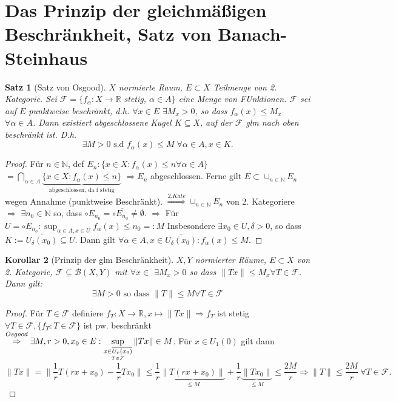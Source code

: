 \documentclass[ngerman]{report}
\theoremstyle{plain}%
\newtheorem{thm}{Satz}[chapter]
\newtheorem{cor}[thm]{Korollar}
\theoremstyle{definition}%
\theoremstyle{myStyle}
\newcommand{\R}{\mathbb{R}}
\newcommand{\N}{\mathbb{N}}
\newcommand{\BS}[1][X,Y]{\mathcal{B}(#1)} %
\newcommand{\norm}[1]{\|#1\|}
\newcommand{\df}[1][]{%
	\overset{#1}{\Rightarrow}
}
\newcommand{\disp}{\displaystyle}
\begin{document}
	\section{Das Prinzip der gleichmäßigen Beschränkheit, Satz von Banach-Steinhaus}
\newcommand{\F}{\mathcal{F}}

	\begin{thm}[Satz von Osgood]
		$X$ normierte Raum, $E \subset X$ Teilmenge von 2. Kategorie.	Sei $\mathcal{F} = \{f_\alpha: X\to \R$ stetig, $\alpha \in A\}$ eine Menge von FUnktionen. $\F$ sei auf $E$ punktweise beschränkt, d.h. $\forall x\in E$ $\exists M_x > 0$, so dass $f_\alpha (x) \leq M_x$ $\forall \alpha \in A$. Dann existiert abgeschlossene Kugel $K\subseteq X$, auf der $\F$ glm nach oben beschränkt ist. D.h.
		$$\exists M > 0 \text{ s.d } f_\alpha (x) \leq M \; \forall \alpha \in A, x\in K.$$
	\end{thm}
	
	\begin{proof}
		Für $n\in \N$, def $E_n : \{x\in X: f_\alpha(x) \leq n \forall \alpha \in A\}$
		$= \bigcap_{\alpha\in A} \underbrace{\{ x\in X: f_\alpha (x) \leq n\}}_{\text{abgeschlossen, da f stetig}}$
		$\df E_n$ abgeschlossen. Ferne gilt $E\subset \cup_{n\in\N} E_n$ wegen Annahme (punktweise Beschränkt). $\df[2. Kate] \cup_{n\in\N} E_n$ von 2. Kategoriere 
		$\df$ $\exists n_0 \in \N$ so, dass $\circ E_{n_0} = \circ \overline{E_{n_0}} \neq \emptyset.$
		$\df$ Für $U = \circ E_{n_o} :\sup_{\alpha \in A, x \in U} f_\alpha (x) \leq n_0 =: M$
		Insbesondere $\exists x_0 \in U, \delta > 0$, so dass $K:= \overline{U_\delta(x_0)} \subseteq U$. Dann gilt $\forall \alpha \in A, x\in \overline{U_\delta(x_0)}: f_\alpha (x) \leq M.$
	\end{proof}

	\begin{cor}[Prinzip der glm Beschränkheit]
		$X,Y$ normierter Räume, $E\subset X$ von 2. Kategorie, 
			$\F \subseteq \BS$ mit $\forall x \in $ $\exists M_x > 0$ so dass $\norm{Tx} \leq M_x \forall T \in \F$.
			Dann gilt: $$\exists M > 0 \text{ so dass } \norm{T} \leq M \forall T \in \F$$
	\end{cor}

	\begin{proof}
		Für $T \in \F$ definiere $f_T: X \to \R, x \mapsto \norm{Tx} \df f_T$ ist stetig $\forall T \in \F, \{f_T: T \in \F\}$ ist pw. beschränkt $\overset{Osgood}{\df} \exists M,r >0, x_0 \in E: \disp \sup_{\underset{T \in \F}{x \in \overline{U_r(x_0)}}} \norm{Tx} \in M$. Für $x \in U_1(0)$ gilt dann
		$$\norm{Tx}=\norm{\frac{1}{r}T(rx+x_0)-\frac{1}{r}Tx_0} \leq \frac{1}{r} \underbrace{\norm{T(rx+x_0)}}_{\leq M} + \frac{1}{r} \underbrace{\norm{Tx_0}}_{\leq M} \leq \frac{2M}{r} \df \norm{T} \leq \frac{2M}{r} ~\forall T \in \F.$$
	\end{proof}
\end{document}
